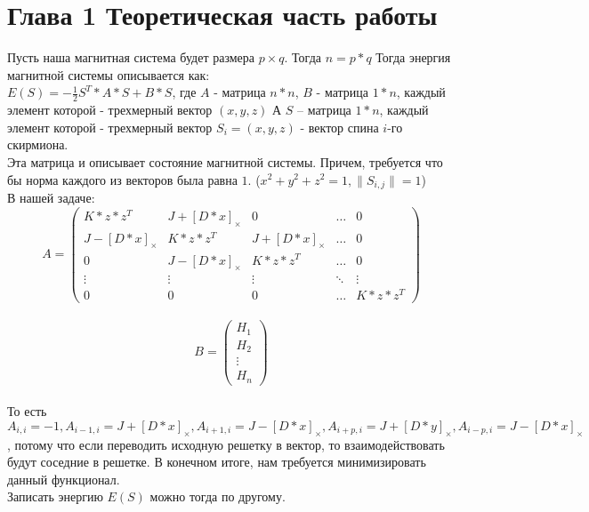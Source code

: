 \documentclass[ 12pt,x11names]{article}
\begin{document}
    \newpage
    \section{Глава 1 Теоретическая часть работы}
    Пусть наша магнитная система будет размера $p \times  q$. Тогда $n =  p * q$
    Тогда энергия магнитной системы описывается как:\\
    $E(S) = - \frac{1}{2}S^T*A*S + B*S$, где $A$ - матрица $n * n$, $B$ - матрица $1 * n$,
    каждый элемент которой - трехмерный вектор $(x, y, z)$
    А $S$ -- матрица $1*n$, каждый элемент которой - трехмерный вектор $S_i = (x, y, z)$ - вектор спина $i$-го скирмиона. \\
        Эта матрица и описывает состояние магнитной системы.
    Причем, требуется что бы норма каждого из векторов была равна $1$.
    ($x^2 + y ^ 2 + z ^ 2 = 1, \|S_{i, j}\| = 1$)\\
    В нашей задаче:
    \begin{equation*}
    A = \left(
    \begin{array}{ccccс}
    K*z*z^T & J + [D*x]_\times & 0  & \ldots & 0\\
    J - [D*x]_\times & K*z*z^T & J + [D*x]_\times &\ldots & 0\\
    0 & J - [D*x]_\times & K*z*z^T &\ldots & 0\\
    \vdots &\vdots &\vdots &\ddots & \vdots\\
    0 & 0 &  0 &\ldots & K*z*z^T
    \end{array}
    \right)
    \end{equation*}\\
     \begin{equation*}
    B = \left(
    \begin{array}{c}
    H_1\\
    H_2\\
    \vdots\\
    H_n
    \end{array}
    \right)
    \end{equation*}\\
    То есть $A_{i, i} = -1,A_{i - 1, i} =  J + [D*x]_\times,
    A_{i+1, i} =  J - [D*x]_\times,
    A_{i + p, i} =  J + [D*y]_\times,
    A_{i - p , i} =  J -  [D*x]_\times$, потому что если переводить исходную решетку в вектор, то взаимодействовать будут соседние в решетке.
    В конечном итоге, нам требуется минимизировать данный функционал.\\
    Записать энергию $E(S)$ можно тогда по другому.\\
\end{document}
